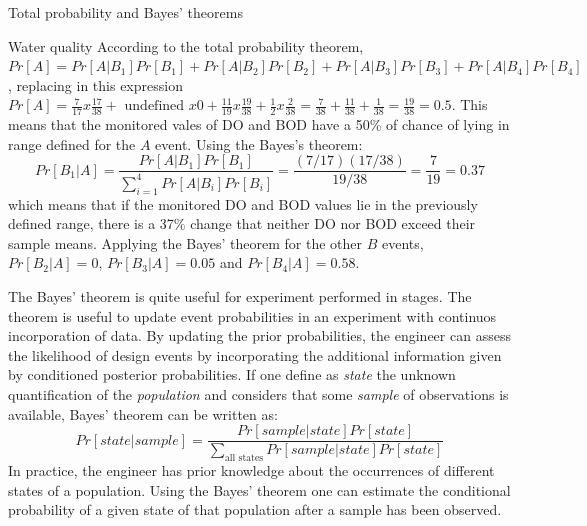 \documentclass[8pt]{beamer}
\begin{document}
\begin{frame}{Total probability and Bayes' theorems}
    \begin{exampleblock}{Water quality}
        According to the total probability theorem, $Pr[A] = Pr[A | B_1] Pr[B_1] + Pr[A | B_2] Pr[B_2] +Pr[A | B_3] Pr[B_3] +Pr[A | B_4] Pr[B_4]$, replacing in this expression $Pr[A] = \frac{7}{17} x \frac{17}{38} + \text{ undefined } x 0 + \frac{11}{19} x \frac{19}{38} + \frac{1}{2} x \frac{2}{38} = \frac{7}{38} + \frac{11}{38} + \frac{1}{38} = \frac{19}{38} = 0.5 $. This means that the monitored vales of DO and BOD have a 50\% of chance of lying in range defined for the $A$ event. Using the Bayes's theorem:
        \vspace{-8pt}
        $$
        Pr[B_1 | A] = \frac{Pr[A | B_1] Pr[B_1]}{\sum_{i=1}^{4} Pr[A | B_i ] Pr[B_i]} = \frac{(7/17)(17/38)}{19/38} = \frac{7}{19} = 0.37
        $$
        which means that if the monitored DO and BOD values lie in the previously defined range, there is a 37\% change that neither DO nor BOD exceed their sample means. Applying the Bayes' theorem for the other $B$ events, $Pr[B_2 | A] = 0$, $Pr[B_3 | A] = 0.05$ and $Pr[B_4 | A] = 0.58$. 
    \end{exampleblock}
    The Bayes' theorem is quite useful for experiment performed in stages. The theorem is useful to update event probabilities in an experiment with continuos incorporation of data. By updating the prior probabilities, the engineer can assess the likelihood of design events by incorporating the additional information given by conditioned posterior probabilities. If one define as \emph{state} the unknown quantification of the \emph{population} and considers that some \emph{sample} of observations is available, Bayes' theorem can be written as:
    \vspace{-10pt}
    $$
    Pr[state | sample] = \frac{Pr[sample | state] Pr[state]}{\sum_{\text{all states}} Pr[sample | state] Pr[state] }
    $$
    In practice, the engineer has prior knowledge about the occurrences of different states of a population. Using the Bayes' theorem one can estimate the conditional probability of a given state of that population after a sample has been observed. 
\end{frame}

\end{document}
